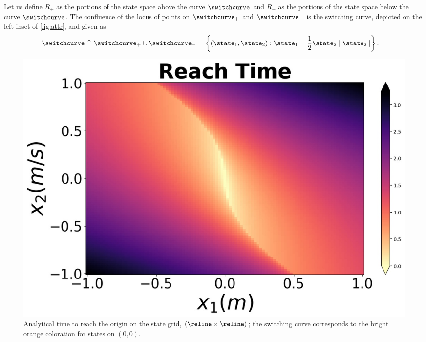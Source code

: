 Let us define $R_+$ as the portions of the state space above the curve $\switchcurve$ and $R_-$ as the portions of the state space below the curve $\switchcurve$.  The confluence of the locus of points on $\switchcurve_+$ and $\switchcurve_-$ is the switching curve, depicted on the left inset of \autoref{fig:attr}, and given as
%
\begin{align}
	\switchcurve \triangleq \switchcurve_+ \cup \switchcurve_- &= \left\{(\state_1, \state_2): \state_1 = \frac{1}{2}\state_2 \mid \state_2 \mid \right\}.
\end{align}
%
\begin{figure}[tb!]
	\centering
	\begin{minipage}[b]{.98\textwidth}
		\includegraphics[width=1.0\textwidth]{figures/attr.jpg}
	\end{minipage}
	\caption{\footnotesize %
		Analytical time to reach the origin on the state grid, $\left(\reline \times \reline\right)$; the switching curve corresponds to the bright orange coloration for states on $(0,0)$.}
	\label{fig:attr}
\end{figure}
%
